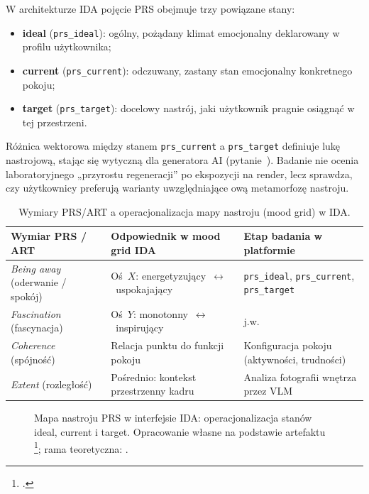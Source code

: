 W architekturze IDA pojęcie PRS obejmuje trzy powiązane stany:
\begin{itemize}
  \item \textbf{ideal} (\texttt{prs\_ideal}): ogólny, pożądany klimat emocjonalny deklarowany w profilu użytkownika;
  \item \textbf{current} (\texttt{prs\_current}): odczuwany, zastany stan emocjonalny konkretnego pokoju;
  \item \textbf{target} (\texttt{prs\_target}): docelowy nastrój, jaki użytkownik pragnie osiągnąć w tej przestrzeni.
\end{itemize}

Różnica wektorowa między stanem \texttt{prs\_current} a \texttt{prs\_target} definiuje lukę nastrojową, stając się wytyczną dla generatora AI (pytanie~). Badanie nie ocenia laboratoryjnego „przyrostu regeneracji” po ekspozycji na render, lecz sprawdza, czy użytkownicy preferują warianty uwzględniające ową metamorfozę nastroju.

\begin{table}[htbp]
  \centering
  \caption{Wymiary PRS/ART a operacjonalizacja mapy nastroju (mood grid) w IDA.}
  \label{tab:ch02:prs-mood-grid}
  \begin{tabular}{@{}p{}p{}p{}@{}}
    \toprule
    Wymiar PRS / ART & Odpowiednik w mood grid IDA & Etap badania w platformie \\
    \midrule
    \emph{Being away} (oderwanie / spokój)
      & Oś~$X$: energetyzujący~$\leftrightarrow$~uspokajający
      & \texttt{prs\_ideal}, \texttt{prs\_current}, \texttt{prs\_target} \\
    \emph{Fascination} (fascynacja)
      & Oś~$Y$: monotonny~$\leftrightarrow$~inspirujący
      & j.w. \\
    \emph{Coherence} (spójność)
      & Relacja punktu do funkcji pokoju
      & Konfiguracja pokoju (aktywności, trudności) \\
    \emph{Extent} (rozległość)
      & Pośrednio: kontekst przestrzenny kadru
      & Analiza fotografii wnętrza przez VLM \\
    \bottomrule
  \end{tabular}
\end{table}

\begin{figure}[htbp]
  \centering
  \caption[Mapa nastroju PRS w interfejsie IDA: operacjonalizacja stanów ideal, current i target. Opracowanie własne na podstawie artefaktu; rama teoretyczna: Hartig i in.]{Mapa nastroju PRS w interfejsie IDA: operacjonalizacja stanów ideal, current i target.
    Opracowanie własne na podstawie artefaktu \footcite{idaPlatform2026}; rama teoretyczna: \textcite{hartig1997prs}.}
  \label{fig:ch02:prs-mood-grid}
\end{figure}

